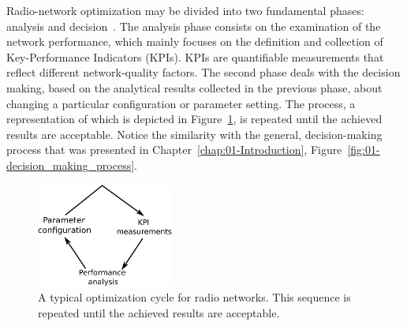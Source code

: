 Radio-network optimization may be divided into two fundamental phases:
analysis and decision~\cite{Nawrocki-Understanding_UMTS_radio_network_modelling_and_optimisation:2006}.
The analysis phase consists on the examination of the network performance,
which mainly focuses on the definition and collection of Key-Performance
Indicators (KPIs).
KPIs are quantifiable measurements that reflect different network-quality
factors. The second phase deals with the decision making, based on
the analytical results collected in the previous phase, about changing
a particular configuration or parameter setting. The process, a representation
of which is depicted in Figure~\ref{fig:Optimization-cycle}, is
repeated until the achieved results are acceptable. Notice the similarity
with the general, decision-making process that was presented in Chapter~\ref{chap:01-Introduction},
Figure~\ref{fig:01-decision_making_process}.

\begin{figure}[h]
\centering

\includegraphics[width=0.4\textwidth]{02-background_and_motivation/img/optimization_cycle}

\caption{A typical optimization cycle for radio networks. This sequence is
repeated until the achieved results are acceptable. \label{fig:Optimization-cycle}}
\end{figure}


\bigskip{}


